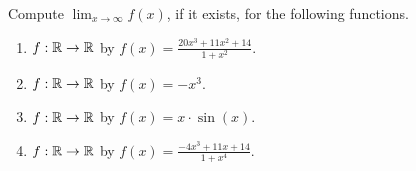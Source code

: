 \begin{example} 
\label{ex:UnboundedLimitAtPlusInfinity}
Compute $\displaystyle \lim_{x \to \infty} f(x)$, if it exists, for the following functions. 

\begin{enumerate}
\renewcommand{\labelenumi}{(\alph{enumi})}
\setlength{\itemsep}{.2cm}
     \item  $f:\mathbb R \to \mathbb R$ by $f(x) = \frac{20 x^3 + 11 x^2 + 14}{1 + x^2}$.
        \item   $f:\mathbb R \to \mathbb R$ by $f(x) = -x^3$.
    \item  $f:\mathbb R \to \mathbb R$ by $f(x) = x \cdot \sin(x)$.
    \item  $f:\mathbb R \to \mathbb R$ by $f(x) = \frac{-4x^3 + 11 x + 14}{1 + x^4}$.
\end{enumerate} 
    
\end{example}



